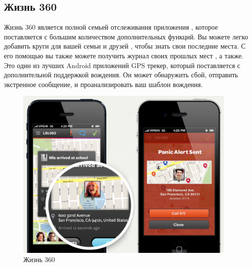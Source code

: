 \documentclass[a4paper,12pt]{article}
\begin{document}
\subsection{Жизнь 360}
Жизнь 360 является полной семьей отслеживания приложения , которое поставляется с большим количеством дополнительных функций. Вы можете легко добавить круги для вашей семьи и друзей , чтобы знать свои последние места. С его помощью вы также можете получить журнал своих прошлых мест , а также. Это один из лучших Android приложений GPS трекер, который поставляется с дополнительной поддержкой вождения. Он может обнаружить сбой, отправить экстренное сообщение, и проанализировать ваш шаблон вождения.\cite{review5}
\begin{figure}
	\centering
	\includegraphics[width=10.94cm]{images/15023617296655.jpg}
	\caption{Жизнь 360}
	\label{fig:card}
\end{figure}
\end{document}
